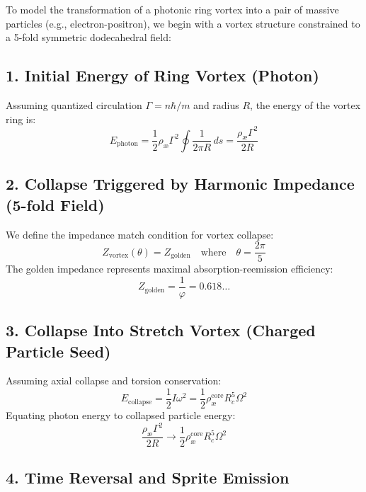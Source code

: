 \documentclass[11pt]{article}
\begin{document}
To model the transformation of a photonic ring vortex into a pair of massive particles (e.g., electron-positron), we begin with a vortex structure constrained to a 5-fold symmetric dodecahedral field:

\subsection*{1. Initial Energy of Ring Vortex (Photon)}
Assuming quantized circulation \( \Gamma = n \hbar / m \) and radius \( R \), the energy of the vortex ring is:
\begin{equation}
    E_{\text{photon}} = \frac{1}{2} \rho_\text{\ae} \Gamma^2 \oint \frac{1}{2\pi R} \, ds = \frac{\rho_\text{\ae} \Gamma^2}{2 R}
\end{equation}

\subsection*{2. Collapse Triggered by Harmonic Impedance (5-fold Field)}
We define the impedance match condition for vortex collapse:
\begin{equation}
    Z_{\text{vortex}}(\theta) = Z_{\text{golden}} \quad \text{where} \quad \theta = \frac{2\pi}{5}
\end{equation}
The golden impedance represents maximal absorption-reemission efficiency:
\begin{equation}
    Z_{\text{golden}} = \frac{1}{\varphi} = 0.618\ldots
\end{equation}

\subsection*{3. Collapse Into Stretch Vortex (Charged Particle Seed)}

Assuming axial collapse and torsion conservation:
\begin{equation}
    E_{\text{collapse}} = \frac{1}{2} I \omega^2 = \frac{1}{2} \rho_\text{\ae}^{\text{core}} R_c^5 \Omega^2
\end{equation}
Equating photon energy to collapsed particle energy:
\begin{equation}
    \frac{\rho_\text{\ae} \Gamma^2}{2 R} \rightarrow \frac{1}{2} \rho_\text{\ae}^{\text{core}} R_c^5 \Omega^2
\end{equation}

\subsection*{4. Time Reversal and Sprite Emission}
\end{document}
